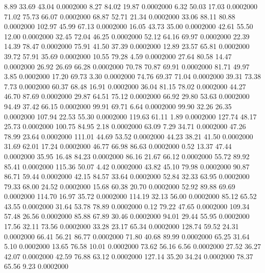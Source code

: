    8.89   33.69   43.04   0.0002000
   8.27   84.02   19.87   0.0002000
   6.32   50.03   17.03   0.0002000
  71.02   75.73   66.07   0.0002000
  68.87   52.71   21.34   0.0002000
  33.06   88.11   80.88   0.0002000
 102.97   45.99   67.13   0.0002000
  16.05   43.73   35.00   0.0002000
  42.61   55.50   12.00   0.0002000
  32.45   72.04   46.25   0.0002000
  52.12   64.16   69.97   0.0002000
  22.39   14.39   78.47   0.0002000
  75.91   41.50   37.39   0.0002000
  12.89   23.57   65.81   0.0002000
  39.72   57.91   35.69   0.0002000
  10.55   79.28    4.59   0.0002000
  27.64   80.58   14.47   0.0002000
  26.92   26.69   66.28   0.0002000
  70.78   70.87   69.91   0.0002000
  81.71   49.97    3.85   0.0002000
  17.20   69.73    3.30   0.0002000
  74.76   69.37   71.04   0.0002000
  39.31   73.38    7.73   0.0002000
  60.37   68.48   16.91   0.0002000
  36.04   81.15   78.02   0.0002000
  44.27   46.70   87.69   0.0002000
  29.87   64.51   75.12   0.0002000
  66.92   29.80   53.63   0.0002000
  94.49   37.42   66.15   0.0002000
  99.91   69.71    6.64   0.0002000
  99.90   32.26   26.35   0.0002000
 107.94   22.53   55.30   0.0002000
 119.63   61.11    1.89   0.0002000
 127.74   48.17   25.73   0.0002000
 100.75   84.95    2.18   0.0002000
  63.09    7.29   34.71   0.0002000
  47.26   78.99   23.64   0.0002000
 111.01   44.69   53.52   0.0002000
  44.23   38.21   41.50   0.0002000
  31.69   62.01   17.24   0.0002000
  46.77   66.98   86.63   0.0002000
   0.52   13.37   47.44   0.0002000
  35.95   16.48   84.23   0.0002000
  86.16   21.67   66.12   0.0002000
  55.72   89.92   85.41   0.0002000
 115.36   50.07    4.42   0.0002000
  43.82   45.10   79.98   0.0002000
  90.87   86.71   59.44   0.0002000
  42.15   84.57   33.64   0.0002000
  52.84   32.33   63.95   0.0002000
  79.33   68.00   24.52   0.0002000
  15.68   60.38   20.70   0.0002000
  52.92   89.88   69.69   0.0002000
 114.70   16.97   35.72   0.0002000
 114.19   32.13   56.00   0.0002000
  85.12   65.52   43.55   0.0002000
  31.64   53.78   78.89   0.0002000
   0.12   79.22   47.65   0.0002000
 109.34   57.48   26.56   0.0002000
  85.88   67.89   30.46   0.0002000
  94.01   29.44   55.95   0.0002000
  17.56   32.11   73.56   0.0002000
  33.28   23.17   65.34   0.0002000
 128.74   59.52   24.31   0.0002000
  66.41   56.21   86.77   0.0002000
  71.80   40.68   89.99   0.0002000
  65.25   31.64    5.10   0.0002000
  13.65   76.58   10.01   0.0002000
  73.62   56.16    6.56   0.0002000
  27.52   36.27   42.07   0.0002000
  42.59   76.88   63.12   0.0002000
 127.14   35.20   34.24   0.0002000
  78.37   65.56    9.23   0.0002000
